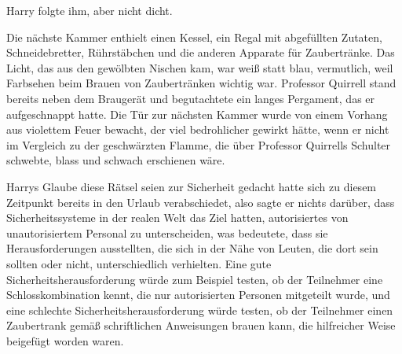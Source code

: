 Harry folgte ihm, aber nicht dicht.

\later

Die nächste Kammer enthielt einen Kessel, ein Regal mit abgefüllten Zutaten, Schneidebretter, Rührstäbchen und die anderen Apparate für Zaubertränke. Das Licht, das aus den gewölbten Nischen kam, war weiß statt blau, vermutlich, weil Farbsehen beim Brauen von Zaubertränken wichtig war.
Professor Quirrell stand bereits neben dem Braugerät und begutachtete ein langes Pergament, das er aufgeschnappt hatte. Die Tür zur nächsten Kammer wurde von einem Vorhang aus violettem Feuer bewacht, der viel bedrohlicher gewirkt hätte, wenn er nicht im Vergleich zu der geschwärzten Flamme, die über Professor Quirrells Schulter schwebte, blass und schwach erschienen wäre.

Harrys Glaube diese Rätsel seien zur Sicherheit gedacht hatte sich zu diesem Zeitpunkt bereits in den Urlaub verabschiedet, also sagte er nichts darüber, dass Sicherheitssysteme in der realen Welt das Ziel hatten, autorisiertes von unautorisiertem Personal zu unterscheiden, was bedeutete, dass sie Herausforderungen ausstellten, die sich in der Nähe von Leuten, die dort sein sollten oder nicht, unterschiedlich verhielten. Eine gute Sicherheitsherausforderung würde zum Beispiel testen, ob der Teilnehmer eine Schlosskombination kennt, die nur autorisierten Personen mitgeteilt wurde, und eine schlechte Sicherheitsherausforderung würde testen, ob der Teilnehmer einen Zaubertrank gemäß schriftlichen Anweisungen brauen kann, die hilfreicher Weise beigefügt worden waren.

